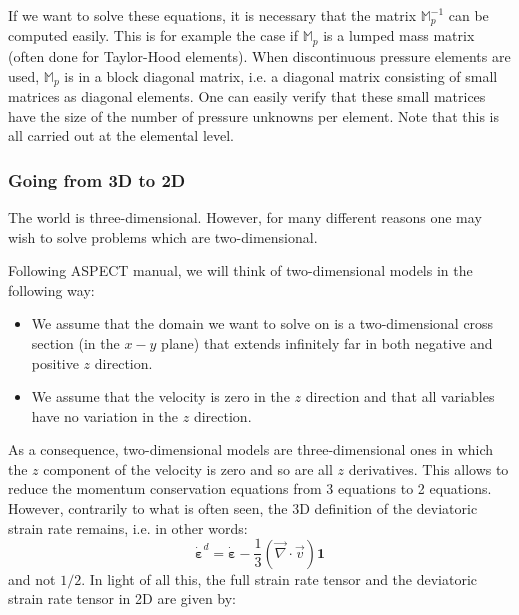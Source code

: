 If we want to solve these equations, it is necessary that the matrix $\mathbb{M}_p^{-1}$
can be computed easily.
This is for example the case if $\mathbb{M}_p$
is a lumped mass matrix (often done for Taylor-Hood elements). 
When discontinuous pressure elements are used,
$\mathbb{M}_p$ is in a block diagonal matrix, i.e. a diagonal matrix consisting of small matrices as diagonal elements. One can easily verify that these small matrices have the size of the number of pressure unknowns per element. Note that this is all carried out at the elemental level.








\subsubsection{Going from 3D to 2D}

The world is three-dimensional. However, for many different reasons one may wish to solve problems
which are two-dimensional. 

Following ASPECT manual, we  will think of two-dimensional models in the following way: 
\begin{itemize}
\item We assume that the domain we want to solve on is a two-dimensional cross section (in the $x-y$ plane) 
that extends infinitely far in both negative and positive $z$ direction.  
\item We assume that the velocity is zero in the $z$ direction and that all variables 
have no variation in the $z$ direction. 
\end{itemize}

As a consequence, two-dimensional models are three-dimensional ones in which the $z$ 
component of the velocity is zero and so are all $z$ derivatives.
This allows to reduce the momentum conservation equations from 3 equations to 2 equations. 
However, contrarily to what is often seen, the 3D definition of the deviatoric strain rate 
remains, i.e. in other words:
\begin{equation}
\dot{\bm \varepsilon}^d = \dot{\bm \varepsilon} -\frac{1}{3}(\vec\nabla\cdot\vec v) {\bm 1} 
\end{equation}
and not $1/2$.
In light of all this, the full strain rate tensor and the 
deviatoric strain rate tensor in 2D are given by:

